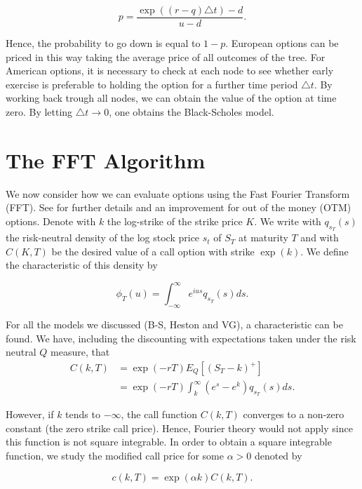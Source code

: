 \documentclass[12pt,a4paper,oneside]{book}
\begin{document}
\begin{equation}
p = \dfrac{\exp{((r-q) \triangle t) -d }}{u-d}.
\end{equation}

Hence, the probability to go down is equal to $1-p$. European options can be priced in this way taking the average price of all outcomes of the tree. For American options, it is necessary
to check at each node to see whether early exercise is preferable to holding the option for a further time period $\triangle t$. By working back trough all nodes, we can obtain the value of the option at time zero. By letting $\triangle t \rightarrow 0$, one obtains the Black-Scholes model.  


\section{The FFT Algorithm}\label{Fast_Fourrier_transform}

We now consider how we can evaluate options using the Fast Fourier
Transform (FFT). See \cite{carr1999option} for further details and an improvement for out of the money (OTM) options. Denote with $k$ the log-strike of the strike price $K$. We write with $q_{s_T}(s)$ the risk-neutral density of the log stock price $s_t$ of $S_T$ at maturity $T$ and with $C(K,T)$ be the desired value of a call option with strike $\exp(k)$. We define the characteristic of this density by 

\begin{equation}
\phi_T(u) = \int_{-\infty}^{\infty} e^{ius} q_{s_T}(s) ds.
\end{equation} 

For all the models we discussed (B-S, Heston and VG), a characteristic can be found. We have, including the discounting with expectations
taken under the risk neutral $Q$ measure, that
\begin{align}
C(k,T) &= \exp(-rT) E_Q [ (S_T - k)^+] \nonumber \\
 		&=  \exp(-rT) \int_{k}^{\infty} (e^{s} - e^k) q_{s_T}(s) ds.
\end{align}

However, if $k$ tends to $-\infty$, the call function $C(k, T)$ converges to a non-zero constant (the zero strike call price). Hence, Fourier theory would not apply since this function is not square integrable. In order to obtain a square integrable function, we study the modified call price for some $\alpha > 0$ denoted by 

\begin{equation}
c(k,T) = \exp(\alpha k) C(k,T).
\end{equation} 
\end{document}
